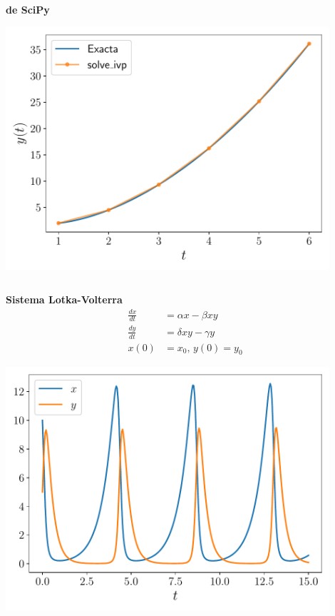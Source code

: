 \documentclass[9pt, aspectratio=169]{beamer}
\begin{document}
\begin{frame}[fragile]
\begin{columns}

\begin{center}
    \textbf{ de SciPy}

    \includegraphics[width=0.9\textwidth]{code/solve_ivp.pdf}
\end{center}
\end{columns}
\end{frame}

\begin{frame}[fragile]
\begin{columns}

\begin{center}
    \textbf{Sistema Lotka-Volterra}
    \begin{align*}
        \frac{dx}{dt} &= \alpha x - \beta x y \\
        \frac{dy}{dt} &= \delta x y - \gamma y \\
        x(0) &= x_0, \, y(0) = y_0
    \end{align*}

    \includegraphics[width=0.9\textwidth]{code/lv.pdf}
\end{center}
\end{columns}
\end{frame}
\end{document}
